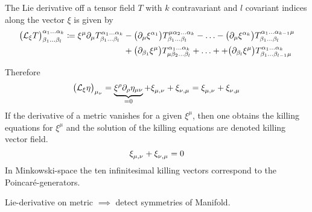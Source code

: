 \begin{definition}
    The Lie derivative off a tensor field $T$ with $k$ contravariant and $l$ covariant indices along the vector $\xi$ is given by
    \begin{equation}
        \begin{split}
            \left( \liedif{\xi}{T} \right)^{\alpha_1\ldots\alpha_k}_{\beta_1\ldots\beta_l}
            \coloneqq \xi^\mu \partial_\mu T^{\alpha_1\ldots\alpha_k}_{\beta_1\ldots\beta_l}
            & - \left( \partial_\mu \xi^{\alpha_1} \right) T^{\mu\alpha_2\ldots\alpha_k}_{\beta_1\ldots\beta_l} - \ldots
            - \left( \partial_\mu \xi^{\alpha_k} \right) T^{\alpha_1\ldots\alpha_{k-1}\mu}_{\beta_1\ldots\beta_l} \\
            & + \left( \partial_{\beta_1} \xi^\mu \right) T^{\alpha_1\ldots\alpha_k}_{\mu\beta_2\ldots\beta_l} + \ldots
            + + \left( \partial_{\beta_l} \xi^\mu \right) T^{\alpha_1\ldots\alpha_k}_{\beta_1\ldots\beta_{l-1}\mu}
        \end{split}
    \end{equation}
\end{definition}
Therefore
\begin{equation}
    \left( \liedif{\xi}{\eta} \right)_{\mu_\nu} = \underbrace{\xi^\rho\partial_\rho\eta_{\mu\nu}}_{=0}
    + \tensor{\xi}{_\mu_,_\nu} + \tensor{\xi}{_\nu_,_\mu} = \tensor{\xi}{_\mu_,_\nu} + \tensor{\xi}{_\nu_,_\mu}
\end{equation}
If the derivative of a metric vanishes for a given $\xi^\mu$, then one obtains the killing equations for $\xi^\mu$ and the solution of the
killing equations are denoted killing vector field.
\begin{equation}
    \tensor{\xi}{_\mu_,_\nu} + \tensor{\xi}{_\nu_,_\mu}=0  %
\end{equation}
In Minkowski-space the ten infinitesimal killing vectors correspond to the Poincaré-generators.
\begin{sidenote}
Lie-derivative on metric $\implies$ detect symmetries of Manifold.
\end{sidenote}
